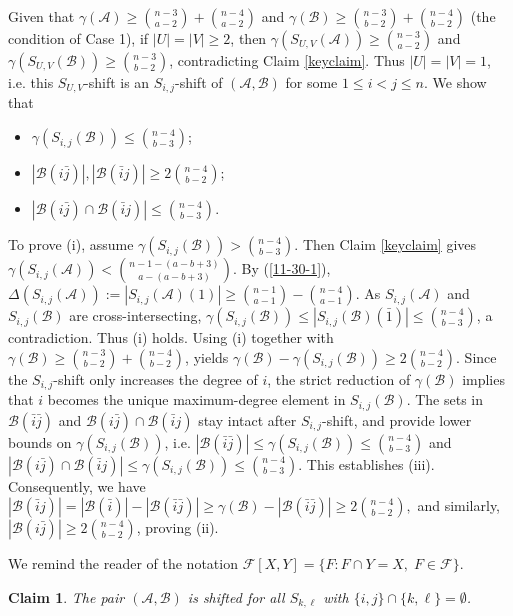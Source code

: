 \documentclass[11pt]{article}
\def\marrow{{\boldmath {\marginpar[\hfill$\rightarrow \rightarrow$]{$\leftarrow \leftarrow$}}}}
\def\andrey#1{{\sc Andrey: }{\marrow\sf \textcolor{blue}{#1}}}
\newcommand{\m}{\mathcal}
\newtheorem{claim}[theorem]{Claim}
\begin{document}
Given that $\gamma(\mathcal{A})\ge {n-3\choose a-2}+{n-4\choose a-2}$ and $\gamma(\mathcal{B})\ge {n-3\choose b-2}+{n-4\choose b-2}$ (the condition of Case 1), 
if $|U|=|V|\ge 2$, then $\gamma(S_{U,V}(\mathcal{A}))\ge {n-3\choose a-2}$ and  $\gamma(S_{U,V}(\mathcal{B}))\ge {n-3\choose b-2}$, contradicting Claim \ref{keyclaim}. Thus $|U|=|V|=1$, i.e. this $S_{U,V}$-shift is an $S_{i,j}$-shift of $(\m A, \m B)$ for some $1\le i<j\le n$. 
We show that 
\begin{itemize}
\item[(i)] $\gamma(S_{i, j}(\mathcal{B}))\le {n-4\choose b-3}$;
\item[(ii)] $|\mathcal{B}(i \bar{j})|, |\mathcal{B}(\bar{i} j)|\ge 2{n-4\choose b-2}$;
\item[(iii)] $|\mathcal{B}(i \bar{j}) \cap \mathcal{B}(\bar{i} j)|\le {n-4\choose b-3}$.
\end{itemize}

To prove (i), assume $\gamma(S_{i, j}(\mathcal{B}))> {n-4\choose b-3}$.
Then Claim \ref{keyclaim} gives $\gamma(S_{i, j}(\mathcal{A}))< {n-1-(a-b+3)\choose a-(a-b+3)}$. 
By (\ref{11-30-1}), $\Delta(S_{i, j}(\mathcal{A})):=|S_{i, j}(\mathcal{A})(1)|\ge{n-1\choose a-1}-{n-4\choose a-1}$. 
As $S_{i, j}(\mathcal{A})$ and $S_{i, j}(\mathcal{B})$ are cross-intersecting,  
$\gamma(S_{i, j}(\mathcal{B}))\le |S_{i, j}(\mathcal{B})(\bar{1})|\le{n-4\choose b-3}$, a contradiction. Thus (i) holds. 
Using (i) together with $\gamma(\mathcal{B})\ge {n-3\choose b-2}+{n-4\choose b-2}$, yields $\gamma(\mathcal{B})-\gamma(S_{i,j}(\mathcal{B}))\ge 2{n-4\choose b-2}$. 
Since the $S_{i,j}$-shift only increases the degree of $i$, the strict reduction of $\gamma(\m B)$ implies that  $i$ becomes the unique  maximum-degree element in $S_{i,j}(\m B)$. 
The sets in $\mathcal{B}(\bar{i}\bar{j})$ and $\mathcal{B}(i \bar{j}) \cap \mathcal{B}(\bar{i} j)$ stay intact after $S_{i,j}$-shift, and provide lower bounds on  $\gamma(S_{i,j}(\mathcal{B}))$, i.e. $|\mathcal{B}(\bar{i}\bar{j})|\le \gamma(S_{i,j}(\mathcal{B}))\le{n-4\choose b-3}$ and $|\mathcal{B}(i \bar{j}) \cap \mathcal{B}(\bar{i} j)|\le \gamma(S_{i,j}(\mathcal{B}))\le{n-4\choose b-3}$.  This establishes (iii). Consequently, we have 
$
|\mathcal{B}(\bar{i}j)|=|\mathcal{B}(\bar{i})|-|\mathcal{B}(\bar{i}\bar{j})|\ge \gamma(\mathcal{B})-|\mathcal{B}(\bar{i}\bar{j})|\ge 2{n-4\choose b-2}, 
$
and similarly, $|\mathcal{B}(i \bar{j})|\ge 2{n-4\choose b-2}$, proving (ii).  


We remind the reader of the notation $\mathcal{F}[X, Y]=\big\{F: F\cap Y = X,\; F\in \mathcal{F} \big\}$. 
\begin{claim}\label{10-28-2}
The pair $(\m A, \m B)$ is shifted for all $S_{k,\ell}$ with $\{i, j\}\cap \{k,\ell\}=\emptyset$.
\end{claim}
\end{document}
